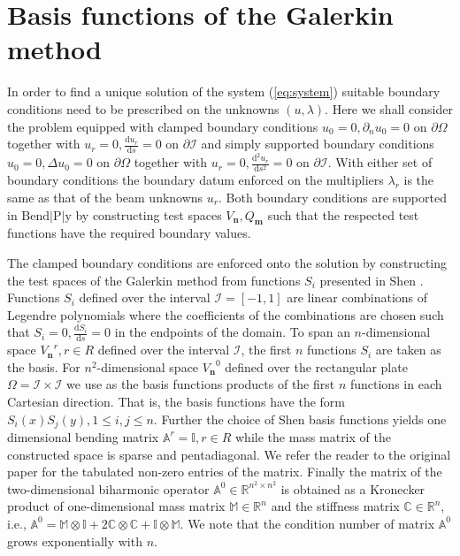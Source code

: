 \documentclass{marine_2015}
\newcommand{\Vh}{\ensuremath{V_{\mathbf{n}}}}
\newcommand{\Qh}{\ensuremath{Q_{\mathbf{m}}}}
\newcommand{\tderiv}[2]{\ensuremath{\tfrac{\mathrm{d}#1}{\mathrm{d}#2}}}
\begin{document}
\section{Basis functions of the Galerkin method}
\label{sec:basis}
In order to find a unique solution of the system (\ref{eq:system}) suitable
boundary conditions need to be prescribed on the unknowns $(u, \lambda)$. Here 
we shall consider the problem equipped with clamped boundary conditions 
$u_0=0, \partial_n u_0=0$ on $\partial\Omega$ together with 
$u_r=0, \tderiv{u_r}{s}=0$ on $\partial\mathcal{I}$ and simply supported
boundary conditions $u_0=0, \Delta u_0=0$ on $\partial\Omega$ together with 
$u_r=0, \tderiv{^2u_r}{s^2}=0$ on $\partial\mathcal{I}$. With either set of boundary
conditions the boundary datum enforced on the multipliers $\lambda_r$ is the
same as that of the beam unknowns $u_r$. Both boundary conditions are 
supported in $\text{Bend}\!\left|\text{P}\right|\!\text{y}$ by constructing test 
spaces $\Vh, \Qh$ such that the respected test functions have the required 
boundary values. 

The clamped boundary conditions are enforced onto the solution by constructing
the test spaces of the Galerkin method from functions $S_i$ presented in Shen
\cite{shenpaper}. Functions $S_i$ defined over the interval
$\mathcal{I}=\left[-1, 1\right]$ are linear combinations of Legendre
polynomials where the coefficients of the combinations are chosen such that
$S_i=0, \tderiv{S_i}{s}=0$ in the endpoints of the domain. To span an $n$-dimensional 
space $\Vh^r, r\in R$ defined over the interval $\mathcal{I}$, the first 
$n$ functions $S_i$ are taken as the basis. For $n^2$-dimensional space $\Vh^0$ 
defined over the rectangular plate $\Omega=\mathcal{I}\times\mathcal{I}$ we use as the 
basis functions products of the first $n$ functions in each Cartesian
direction. That is, the basis functions have the form
$S_i\left(x\right)S_j\left(y\right), 1\leq i, j \leq n$. Further the choice of Shen 
basis functions yields one dimensional bending matrix $\mathbb{A}^r=\mathbb{I},
r\in R$ while the mass matrix of the constructed space is sparse and pentadiagonal. 
We refer the reader to the original paper \cite{shenpaper} for the tabulated non-zero entries 
of the matrix. Finally the matrix of the two-dimensional 
biharmonic operator $\mathbb{A}^0\in\mathbb{R}^{n^2\times n^2}$ is obtained
as a Kronecker product of one-dimensional mass matrix $\mathbb{M}\in\mathbb{R}^n$ and 
the stiffness matrix $\mathbb{C}\in\mathbb{R}^n$, i.e., $\mathbb{A}^0 = \mathbb{M}\otimes\mathbb{I} + 
2\mathbb{C}\otimes\mathbb{C} + \mathbb{I}\otimes\mathbb{M}$. We note that the
condition number of matrix $\mathbb{A}^0$ grows exponentially with $n$.
\end{document}
